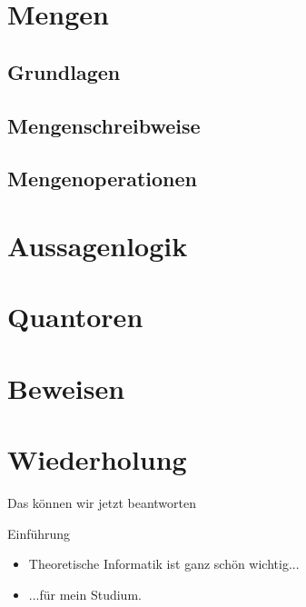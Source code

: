 
\section{Mengen}
\subsection{Grundlagen}


\subsection{Mengenschreibweise}


\subsection{Mengenoperationen}



\section{Aussagenlogik}


\section{Quantoren}


\section{Beweisen}


\section{Wiederholung}
\begin{frame}[fragile]{Das können wir jetzt beantworten}
	\begin{alertblock}{Einführung}
		\begin{itemize}
			\item Theoretische Informatik ist ganz schön wichtig...
			\item ...für mein Studium.
		\end{itemize}
	\end{alertblock}
\end{frame}

